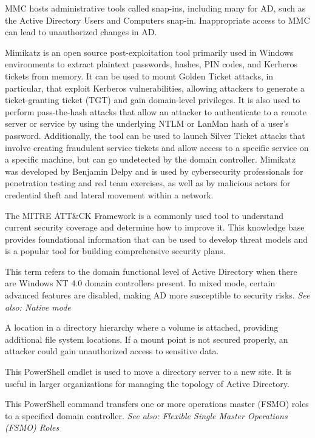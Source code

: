  MMC hosts administrative tools called snap-ins, including many for AD, such as the Active Directory Users and Computers snap-in. Inappropriate access to MMC can lead to unauthorized changes in AD.

 Mimikatz is an open source post-exploitation tool primarily used in Windows environments to extract plaintext passwords, hashes, PIN codes, and Kerberos tickets from memory. It can be used to mount Golden Ticket attacks, in particular, that exploit Kerberos vulnerabilities, allowing attackers to generate a ticket-granting ticket (TGT) and gain domain-level privileges. It is also used to perform pass-the-hash attacks that allow an attacker to authenticate to a remote server or service by using the underlying NTLM or LanMan hash of a user’s password. Additionally, the tool can be used to launch Silver Ticket attacks that involve creating fraudulent service tickets and allow access to a specific service on a specific machine, but can go undetected by the domain controller. Mimikatz was developed by Benjamin Delpy and is used by cybersecurity professionals for penetration testing and red team exercises, as well as by malicious actors for credential theft and lateral movement within a network.

 The MITRE ATT\&CK Framework is a commonly used tool to understand current security coverage and determine how to improve it. This knowledge base provides foundational information that can be used to develop threat models and is a popular tool for building comprehensive security plans. 

 This term refers to the domain functional level of Active Directory when there are Windows NT 4.0 domain controllers present. In mixed mode, certain advanced features are disabled, making AD more susceptible to security risks.
\textit{See also: Native mode}

 A location in a directory hierarchy where a volume is attached, providing additional file system locations. If a mount point is not secured properly, an attacker could gain unauthorized access to sensitive data.

 This PowerShell cmdlet is used to move a directory server to a new site. It is useful in larger organizations for managing the topology of Active Directory.

 This PowerShell command transfers one or more operations master (FSMO) roles to a specified domain controller.
\textit{See also: Flexible Single Master Operations (FSMO) Roles}

